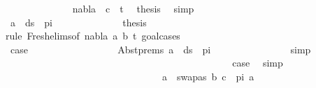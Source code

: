 \begin{isabellebody}
\ \ \ \ \ \ \ \ \ \ \ \ \isamarkupfalse%
\ {\isacartoucheopen}nabla\ {\isasymturnstile}\ c\ {\isasymsharp}\ t{\isacharprime}{\kern0pt}{\isacartoucheclose}\ \isamarkupfalse%
\ {\isacharquery}{\kern0pt}thesis\ \isamarkupfalse%
\ simp\isanewline
\ \ \ \ \ \ \ \ \ \ \isamarkupfalse%
\isanewline
\ \ \ \ \ \ \ \ \ \ \ \ \isamarkupfalse%
\ {\isachardoublequoteopen}a\ {\isasymin}\ ds\ {\isacharbrackleft}{\kern0pt}{\isacharbrackright}{\kern0pt}\ pi{\isachardoublequoteclose}\isanewline
\ \ \ \ \ \ \ \ \ \ \ \ \isamarkupfalse%
\ {\isacharquery}{\kern0pt}thesis\ \isanewline
\ \ \ \ \ \ \ \ \ \ \ \ \isamarkupfalse%
{\isacharparenleft}{\kern0pt}rule\ Fresh{\isacharunderscore}{\kern0pt}elims{\isacharparenleft}{\kern0pt}{}{\isacharparenright}{\kern0pt}{\isacharbrackleft}{\kern0pt}of\ nabla\ a\ b\ t{\isacharprime}{\kern0pt}{\isacharbrackright}{\kern0pt}{\isacharcomma}{\kern0pt}\ goal{\isacharunderscore}{\kern0pt}cases{\isacharparenright}{\kern0pt}\isanewline
\ \ \ \ \ \ \ \ \ \ \ \ \ \ \isamarkupfalse%
\ {}\isanewline
\ \ \ \ \ \ \ \ \ \ \ \ \ \ \isamarkupfalse%
\ \isamarkupfalse%
\ {\isacharquery}{\kern0pt}case\isanewline
\ \ \ \ \ \ \ \ \ \ \ \ \ \ \ \ \isamarkupfalse%
\ Abst{\isachardot}{\kern0pt}prems\ {\isacartoucheopen}a\ {\isasymin}\ ds\ {\isacharbrackleft}{\kern0pt}{\isacharbrackright}{\kern0pt}\ pi{\isacartoucheclose}\isanewline
\ \ \ \ \ \ \ \ \ \ \ \ \ \ \isamarkupfalse%
\ simp\isanewline
\ \ \ \ \ \ \ \ \ \ \ \ \isamarkupfalse%
\isanewline
\ \ \ \ \ \ \ \ \ \ \ \ \ \ \isamarkupfalse%
\ {}\isanewline
\ \ \ \ \ \ \ \ \ \ \ \ \ \ \isamarkupfalse%
\ \isamarkupfalse%
\ {\isacharquery}{\kern0pt}case\ \isamarkupfalse%
\ simp\isanewline
\ \ \ \ \ \ \ \ \ \ \ \ \isamarkupfalse%
\isanewline
\ \ \ \ \ \ \ \ \ \ \ \ \ \ \isamarkupfalse%
\ {}\isanewline
\ \ \ \ \ \ \ \ \ \ \ \ \ \ \isamarkupfalse%
\ {\isachardoublequoteopen}a\ {\isasymnoteq}\ swapas\ {\isacharparenleft}{\kern0pt}{\isacharparenleft}{\kern0pt}b{\isacharcomma}{\kern0pt}\ c{\isacharparenright}{\kern0pt}\ {\isacharhash}{\kern0pt}\ pi{\isacharparenright}{\kern0pt}\ a{\isachardoublequoteclose}\ \isanewline
\ \ \ \ \ \ \ \ \ \ \ \ \ \ \ \ \isamarkupfalse%

\end{isabellebody}
